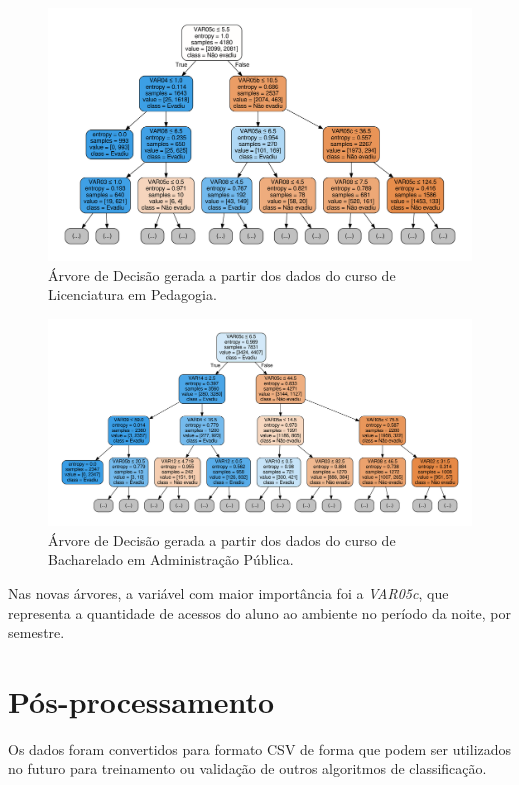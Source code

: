 \begin{figure}[!htb]
  \centering
  \caption{\label{treePedNoVar07} Árvore de Decisão gerada a partir dos dados do curso de Licenciatura em Pedagogia.}
  \includegraphics[angle=-90,scale=.50]{img/ped_tree_no_var07}
  \Ididthis
\end{figure}

\begin{figure}[!htb]
  \centering
  \caption{\label{treeAdmNoVar07} Árvore de Decisão gerada a partir dos dados do curso de Bacharelado em Administração Pública.}
  \includegraphics[angle=-90,scale=.50]{img/adm_tree_no_var07}
  \Ididthis
\end{figure}

Nas novas árvores, a variável com maior importância foi a \textit{VAR05c}, que
representa a quantidade de acessos do aluno ao ambiente no período da noite, por
semestre.

\section{Pós-processamento}

Os dados foram convertidos para formato CSV de forma que podem ser utilizados no
futuro para treinamento ou validação de outros algoritmos de classificação.

